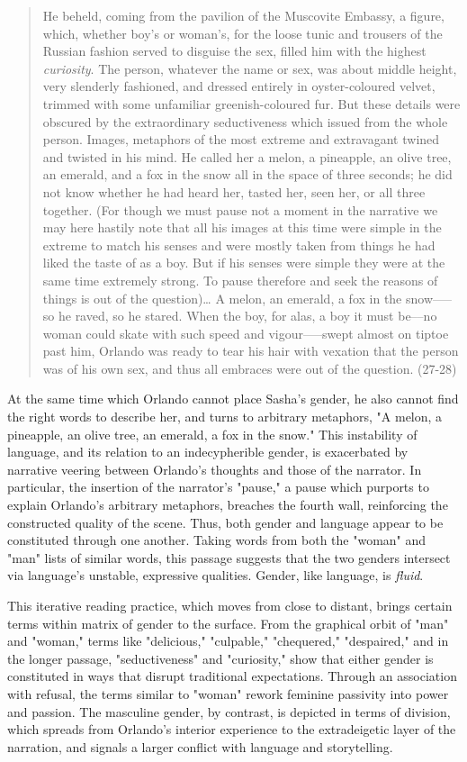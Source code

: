 \documentclass[11pt]{article}
\begin{document}
\begin{quote}
He beheld, coming from the pavilion of the Muscovite Embassy, a
figure, which, whether boy’s or woman’s, for the loose tunic and
trousers of the Russian fashion served to disguise the sex, filled him
with the highest \emph{curiosity}. The person, whatever the name or sex,
was about middle height, very slenderly fashioned, and dressed
entirely in oyster-coloured velvet, trimmed with some unfamiliar
greenish-coloured fur. But these details were obscured by the
extraordinary seductiveness which issued from the whole person.
Images, metaphors of the most extreme and extravagant twined and
twisted in his mind. He called her a melon, a pineapple, an olive
tree, an emerald, and a fox in the snow all in the space of three
seconds; he did not know whether he had heard her, tasted her, seen
her, or all three together. (For though we must pause not a moment in
the narrative we may here hastily note that all his images at this
time were simple in the extreme to match his senses and were mostly
taken from things he had liked the taste of as a boy. But if his
senses were simple they were at the same time extremely strong. To
pause therefore and seek the reasons of things is out of the
question)\ldots{} A melon, an emerald, a fox in the snow—--so he raved, so
he stared. When the boy, for alas, a boy it must be–--no woman could
skate with such speed and vigour—--swept almost on tiptoe past him,
Orlando was ready to tear his hair with vexation that the person was
of his own sex, and thus all embraces were out of the question.
(27-28)
\end{quote}

At the same time which Orlando cannot place Sasha’s gender, he also
cannot find the right words to describe her, and turns to arbitrary
metaphors, "A melon, a pineapple, an olive tree, an emerald, a fox in
the snow." This instability of language, and its relation to an
indecypherible gender, is exacerbated by narrative veering between
Orlando's thoughts and those of the narrator. In particular, the
insertion of the narrator’s "pause," a pause which purports to explain
Orlando's arbitrary metaphors, breaches the fourth wall, reinforcing
the constructed quality of the scene. Thus, both gender and language
appear to be constituted through one another. Taking words from both
the "woman" and "man" lists of similar words, this passage suggests
that the two genders intersect via language's unstable, expressive
qualities. Gender, like language, is \emph{fluid}.

This iterative reading practice, which moves from close to distant,
brings certain terms within matrix of gender to the surface. From the
graphical orbit of "man" and "woman," terms like "delicious,"
"culpable," "chequered," "despaired," and in the longer passage,
"seductiveness" and "curiosity," show that either gender is
constituted in ways that disrupt traditional expectations. Through an
association with refusal, the terms similar to "woman" rework feminine
passivity into power and passion. The masculine gender, by contrast,
is depicted in terms of division, which spreads from Orlando's
interior experience to the extradeigetic layer of the narration, and
signals a larger conflict with language and storytelling.
\end{document}
